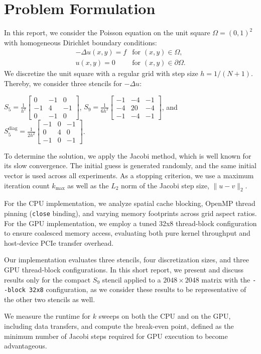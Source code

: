 \section{Problem Formulation}\label{cap:theo}
In this report, we consider the Poisson equation on the unit square $\Omega = (0,1)^2$ with homogeneous Dirichlet boundary conditions:
\begin{eqnarray}
        -\Delta u(x, y) = f & \text{for } (x, y)\in\Omega, \\ 
        u(x, y) = 0 & \text{for } (x, y)\in\partial\Omega. 
\end{eqnarray}
We discretize the unit square with a regular grid with step size $h = 1/(N + 1)$. 
Thereby, we consider three stencils for $-\Delta u$: 

$S_5 = \frac{1}{h^2} \begin{bmatrix} 0 & -1 & 0 \\ -1 & 4 & -1 \\ 0 & -1 & 0 \end{bmatrix}$, 
$S_9 = \frac{1}{6h^2} \begin{bmatrix} -1 & -4 & -1 \\ -4 & 20 & -4 \\ -1 & -4 & -1 \end{bmatrix}$, and 
$S_5^{\text{diag}} = \frac{1}{2h^2} \begin{bmatrix} -1 & 0 & -1 \\ 0 & 4 & 0 \\ -1 & 0 & -1 \end{bmatrix}$. 

To determine the solution, we apply the Jacobi method, which is well known for its slow convergence. 
The initial guess is generated randomly, and the same initial vector is used across all experiments.
As a stopping criterion, we use a maximum iteration count $k_{\max}$ as well as the $L_2$ norm of the Jacobi step size, $\|u - v\|_2$.

For the CPU implementation, we analyze spatial cache blocking, OpenMP thread pinning (\texttt{close} binding), and varying memory footprints across grid aspect ratios. For the GPU implementation, we employ a tuned 32x8 thread-block configuration to ensure coalesced memory access, evaluating both pure kernel throughput and host-device PCIe transfer overhead.

Our implementation evaluates three stencils, four discretization sizes, and three GPU thread-block configurations. 
In this short report, we present and discuss results only for the compact $S_9$ stencil applied to a $2048 \times 2048$ matrix with the \texttt{-{}-block 32x8}  configuration, 
as we consider these results to be representative of the other two stencils as well. 

We measure the runtime for $k$ sweeps on both the CPU and on the GPU, including data transfers, and compute the break-even point, 
defined as the minimum number of Jacobi steps required for GPU execution to become advantageous.
